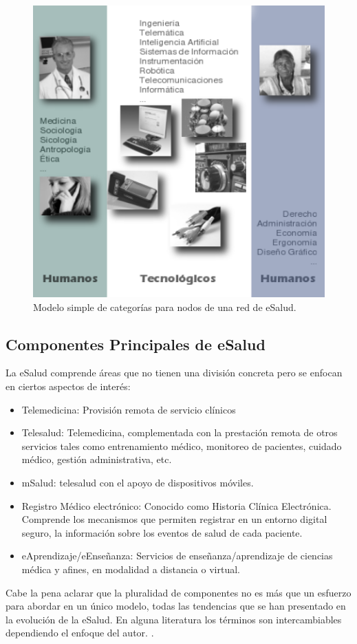 \begin{figure}
 \centering
 \includegraphics[width=130mm]{sistema_telemedicina.png}
 \caption{Modelo simple de categorías para nodos de una red de eSalud.}
 \label{elementosred}
\end{figure}

\subsection{Componentes Principales de eSalud}

La eSalud comprende áreas que no tienen una división concreta pero se enfocan en ciertos aspectos de interés:

\begin{itemize}
 \item Telemedicina: Provisión remota de servicio clínicos
 \item Telesalud: Telemedicina, complementada con la prestación remota de otros servicios tales como entrenamiento médico, monitoreo de pacientes, cuidado médico, gestión administrativa, etc. 
 \item mSalud: telesalud con el apoyo de dispositivos móviles.
 \item Registro Médico electrónico: Conocido como Historia Clínica Electrónica. Comprende los mecanismos que permiten registrar en un entorno digital seguro, la información sobre los eventos de salud de cada paciente.
 \item eAprendizaje/eEnseñanza: Servicios de enseñanza/aprendizaje de ciencias médica y afines, en modalidad a distancia o virtual.
\end{itemize}

Cabe la pena aclarar que la pluralidad de componentes no es más que un esfuerzo para abordar en un único modelo, todas las tendencias que se han presentado en la evolución de la eSalud. En alguna literatura los términos son intercambiables dependiendo el enfoque del autor. \cite{oms2010}.